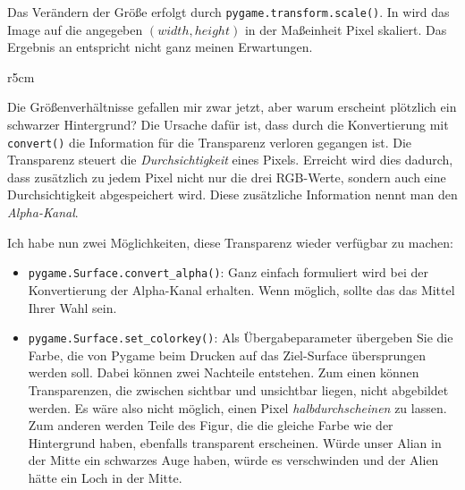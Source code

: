 Das Verändern der Größe erfolgt durch \texttt{pygame.transform.scale()}. In  wird das Image auf die angegeben $(width, height)$ in der Maßeinheit Pixel skaliert. Das Ergebnis an  entspricht nicht ganz meinen Erwartungen.  

\begin{wrapfigure}[9]{r}{5cm}
    \vspace{-1em}
\end{wrapfigure}
\label{pageTransparenz}Die Größenverhältnisse gefallen mir zwar jetzt, aber warum erscheint plötzlich ein schwarzer Hintergrund? Die Ursache dafür ist, dass durch die Konvertierung mit \texttt{convert()} die Information für die Transparenz verloren gegangen ist. Die Transparenz steuert die \emph{Durchsichtigkeit} eines Pixels. Erreicht wird dies dadurch, dass zusätzlich zu jedem Pixel nicht nur die drei RGB-Werte, sondern auch eine Durchsichtigkeit abgespeichert wird. Diese zusätzliche Information nennt man den \emph{Alpha-Kanal}.

Ich habe nun zwei Möglichkeiten, diese Transparenz wieder verfügbar zu machen:
\begin{itemize}
	\item \texttt{pygame.Surface.convert\_alpha()}: Ganz einfach formuliert wird bei der Konvertierung der Alpha-Kanal erhalten. Wenn möglich, sollte das das Mittel Ihrer Wahl sein.
	
	\item \texttt{pygame.Surface.set\_colorkey()}: Als Übergabeparameter übergeben Sie die Farbe, die von Pygame beim Drucken auf das Ziel-Surface übersprungen werden soll. Dabei können zwei Nachteile entstehen. Zum einen können Transparenzen, die zwischen sichtbar und unsichtbar liegen, nicht abgebildet werden. Es wäre also nicht möglich, einen Pixel \emph{halbdurchscheinen} zu lassen. Zum anderen werden Teile des Figur, die die gleiche Farbe wie der Hintergrund haben, ebenfalls transparent erscheinen. Würde unser Alian in der Mitte ein schwarzes Auge haben, würde es verschwinden und der Alien hätte ein Loch in der Mitte.
\end{itemize}

